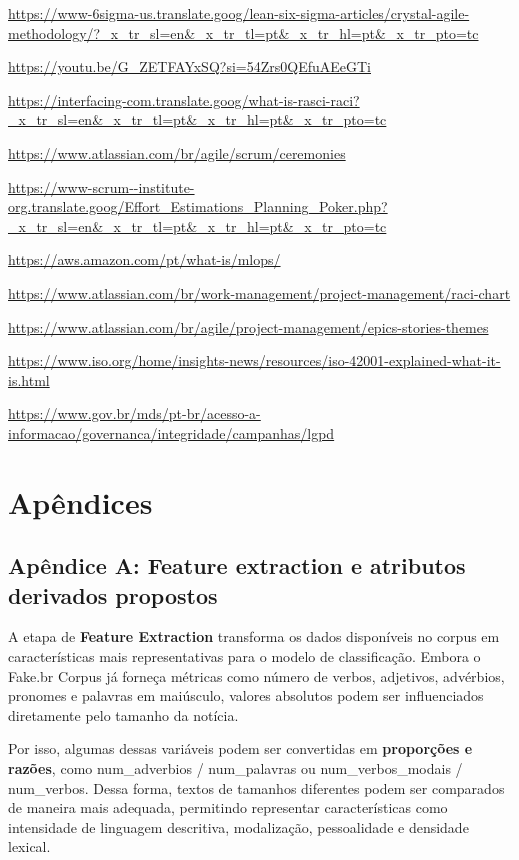 \documentclass[
  brazilian,
  11pt,
]{article}
\begin{document}
\url{https://www-6sigma-us.translate.goog/lean-six-sigma-articles/crystal-agile-methodology/?_x_tr_sl=en&_x_tr_tl=pt&_x_tr_hl=pt&_x_tr_pto=tc}

\url{https://youtu.be/G_ZETFAYxSQ?si=54Zrs0QEfuAEeGTi}

\url{https://interfacing-com.translate.goog/what-is-rasci-raci?_x_tr_sl=en&_x_tr_tl=pt&_x_tr_hl=pt&_x_tr_pto=tc}

\url{https://www.atlassian.com/br/agile/scrum/ceremonies}

\url{https://www-scrum--institute-org.translate.goog/Effort_Estimations_Planning_Poker.php?_x_tr_sl=en&_x_tr_tl=pt&_x_tr_hl=pt&_x_tr_pto=tc}

\url{https://aws.amazon.com/pt/what-is/mlops/}

\url{https://www.atlassian.com/br/work-management/project-management/raci-chart}

\url{https://www.atlassian.com/br/agile/project-management/epics-stories-themes}

\url{https://www.iso.org/home/insights-news/resources/iso-42001-explained-what-it-is.html}

\url{https://www.gov.br/mds/pt-br/acesso-a-informacao/governanca/integridade/campanhas/lgpd}

\section{Apêndices}\label{apuxeandices}

\subsection{Apêndice A: Feature extraction e atributos derivados propostos}\label{apuxeandice-a-feature-extraction-e-atributos-derivados-propostos}

A etapa de \textbf{Feature Extraction} transforma os dados disponíveis no corpus em características mais representativas para o modelo de classificação. Embora o Fake.br Corpus já forneça métricas como número de verbos, adjetivos, advérbios, pronomes e palavras em maiúsculo, valores absolutos podem ser influenciados diretamente pelo tamanho da notícia.

Por isso, algumas dessas variáveis podem ser convertidas em \textbf{proporções e razões}, como num\_adverbios / num\_palavras ou num\_verbos\_modais / num\_verbos. Dessa forma, textos de tamanhos diferentes podem ser comparados de maneira mais adequada, permitindo representar características como intensidade de linguagem descritiva, modalização, pessoalidade e densidade lexical.
\end{document}
